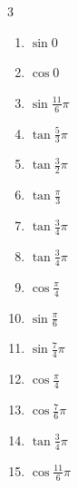 \begin{multicols}{3}
\begin{enumerate}
  \item $\displaystyle \sin{0}$
        \phantom{$\displaystyle =0$}

  \item $\displaystyle \cos{0}$
        \phantom{$\displaystyle =1$}

  \item $\displaystyle \sin{\frac{11}{6}\pi}$

  \item $\displaystyle \tan{\frac{5}{3}\pi}$

  \item $\displaystyle \tan{\frac{3}{2}\pi}$
        \phantom{$\displaystyle \quad なし$}

\columnbreak %

  \item $\displaystyle \tan{\frac{\pi}{3}}$

  \item $\displaystyle \tan{\frac{3}{4}\pi}$
        \phantom{$\displaystyle =-1$}

  \item $\displaystyle \tan{\frac{3}{4}\pi}$
        \phantom{$\displaystyle =-1$}

  \item $\displaystyle \cos{\frac{\pi}{4}}$

  \item $\displaystyle \sin{\frac{\pi}{6}}$

  \item $\displaystyle \sin{\frac{7}{4}\pi}$

  \item $\displaystyle \cos{\frac{\pi}{4}}$

  \item $\displaystyle \cos{\frac{7}{6}\pi}$

  \item $\displaystyle \tan{\frac{3}{4}\pi}$
        \phantom{$\displaystyle =-1$}

  \item $\displaystyle \cos{\frac{11}{6}\pi}$


\end{enumerate}
\end{multicols}
